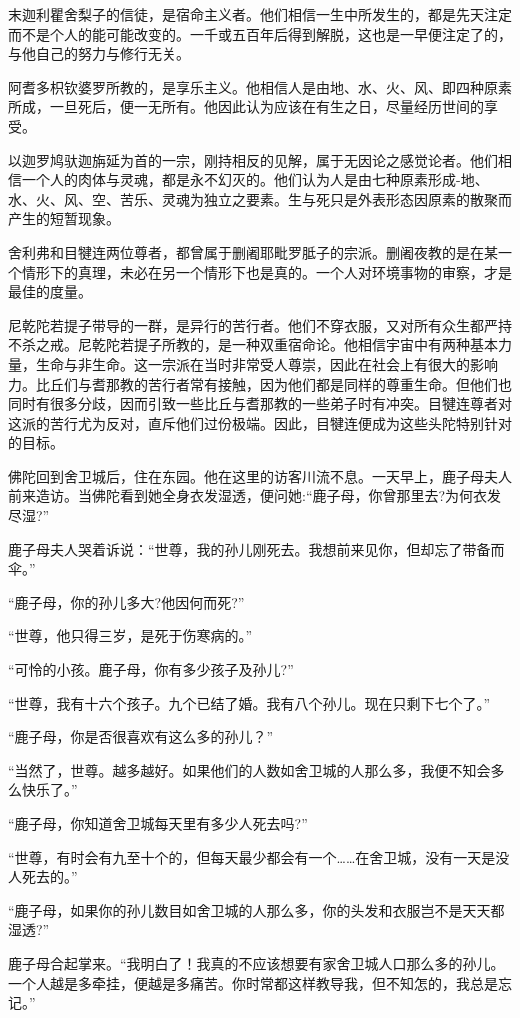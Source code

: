 \documentclass[12pt,twoside,openany]{book}
\begin{document}
末迦利瞿舍梨子的信徒，是宿命主义者。他们相信一生中所发生的，都是先天注定而不是个人的能可能改变的。一千或五百年后得到解脱，这也是一早便注定了的，与他自己的努力与修行无关。

阿耆多枳钦婆罗所教的，是享乐主义。他相信人是由地、水、火、风、即四种原素所成，一旦死后，便一无所有。他因此认为应该在有生之日，尽量经历世间的享受。

以迦罗鸠驮迦旃延为首的一宗，刚持相反的见解，属于无因论之感觉论者。他们相信一个人的肉体与灵魂，都是永不幻灭的。他们认为人是由七种原素形成-地、水、火、风、空、苦乐、灵魂为独立之要素。生与死只是外表形态因原素的散聚而产生的短暂现象。

舍利弗和目犍连两位尊者，都曾属于删阇耶毗罗胝子的宗派。删阇夜教的是在某一个情形下的真理，未必在另一个情形下也是真的。一个人对环境事物的审察，才是最佳的度量。

尼乾陀若提子带导的一群，是异行的苦行者。他们不穿衣服，又对所有众生都严持不杀之戒。尼乾陀若提子所教的，是一种双重宿命论。他相信宇宙中有两种基本力量，生命与非生命。这一宗派在当时非常受人尊崇，因此在社会上有很大的影响力。比丘们与耆那教的苦行者常有接触，因为他们都是同样的尊重生命。但他们也同时有很多分歧，因而引致一些比丘与耆那教的一些弟子时有冲突。目犍连尊者对这派的苦行尤为反对，直斥他们过份极端。因此，目犍连便成为这些头陀特别针对的目标。

佛陀回到舍卫城后，住在东园。他在这里的访客川流不息。一天早上，鹿子母夫人前来造访。当佛陀看到她全身衣发湿透，便问她:“鹿子母，你曾那里去?为何衣发尽湿?”

鹿子母夫人哭着诉说：“世尊，我的孙儿刚死去。我想前来见你，但却忘了带备而伞。”

“鹿子母，你的孙儿多大?他因何而死?”

“世尊，他只得三岁，是死于伤寒病的。”

“可怜的小孩。鹿子母，你有多少孩子及孙儿?”

“世尊，我有十六个孩子。九个已结了婚。我有八个孙儿。现在只剩下七个了。”

“鹿子母，你是否很喜欢有这么多的孙儿？”

“当然了，世尊。越多越好。如果他们的人数如舍卫城的人那么多，我便不知会多么快乐了。”

“鹿子母，你知道舍卫城每天里有多少人死去吗?”

“世尊，有时会有九至十个的，但每天最少都会有一个……在舍卫城，没有一天是没人死去的。”

“鹿子母，如果你的孙儿数目如舍卫城的人那么多，你的头发和衣服岂不是天天都湿透?”

鹿子母合起掌来。“我明白了！我真的不应该想要有家舍卫城人口那么多的孙儿。一个人越是多牵挂，便越是多痛苦。你时常都这样教导我，但不知怎的，我总是忘记。”
\end{document}
